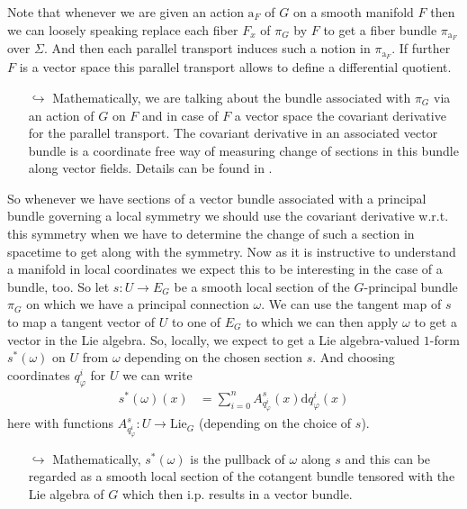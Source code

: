 \begin{enumerate}
\begin{enumerate}
\end{enumerate}
Note that whenever we are given an action $\mathrm{a}_{F}$ of $G$ on a smooth manifold $F$ then we can loosely speaking replace each fiber $F_{x}$ of $\pi_{G}$ by $F$ to get a fiber bundle $\pi_{\mathrm{a}_{F}}$ over $\Sigma$. And then each parallel transport induces such a notion in $\pi_{\mathrm{a}_{F}}$. If further $F$ is a vector space this parallel transport allows to define a differential quotient.
\begin{enumerate}
\item[$\pmb{\hookrightarrow}$]
Mathematically, we are talking about the bundle associated with $\pi_{G}$ via an action of $G$ on $F$ and in case of $F$ a vector space the covariant derivative for the parallel transport. The covariant derivative in an associated vector bundle is a coordinate free way of measuring change of sections in this bundle along vector fields. Details can be found in \cite{797789bc}.
\end{enumerate}
So whenever we have sections of a vector bundle associated with a principal bundle governing a local symmetry we should use the covariant derivative w.r.t. this symmetry when we have to determine the change of such a section in spacetime to get along with the symmetry. Now as it is instructive to understand a manifold in local coordinates we expect this to be interesting in the case of a bundle, too. So let $s \colon U \rightarrow E_{G}$ be a smooth local section of the $G$-principal bundle $\pi_{G}$ on which we have a principal connection $\omega$. We can use the tangent map of $s$ to map a tangent vector of $U$ to one of $E_{G}$ to which we can then apply $\omega$ to get a vector in the Lie algebra. So, locally, we expect to get a Lie algebra-valued $1$-form $s^{\ast}(\omega)$ on $U$ from $\omega$ depending on the chosen section $s$. And choosing coordinates $q_{\varphi}^{i}$ for $U$ we can write
\begin{align*}
  s^{\ast}(\omega)(x)
  &=
  \sum_{i=0}^{n}
  A_{q_{\varphi}^{i}}^{s}(x)
  \mathrm{d}q_{\varphi}^{i}(x)
\end{align*}
here with functions $A_{q_{\varphi}^{i}}^{s} \colon U \rightarrow \mathrm{Lie}_{G}$ (depending on the choice of $s$).
\begin{enumerate}
\item[$\pmb{\hookrightarrow}$]
Mathematically, $s^{\ast}(\omega)$ is the pullback of $\omega$ along $s$ and this can be regarded as a smooth local section of the cotangent bundle tensored with the Lie algebra of $G$ which then i.p. results in a vector bundle.

\end{enumerate}
\end{enumerate}
